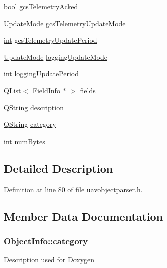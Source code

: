 \begin{DoxyCompactItemize}
\item 
bool \hyperlink{struct_object_info_aa24c62cec1226eb0b3aa40601db8a06e}{gcs\-Telemetry\-Acked}
\item 
\hyperlink{uavobjectparser_8h_af6f79ca652f5cd37cb76957fb76b1630}{Update\-Mode} \hyperlink{struct_object_info_a62c810f99f09ed18bcb16eb2c564197f}{gcs\-Telemetry\-Update\-Mode}
\item 
\hyperlink{ioapi_8h_a787fa3cf048117ba7123753c1e74fcd6}{int} \hyperlink{struct_object_info_a01aada7cce704710f0c296f60bcb4424}{gcs\-Telemetry\-Update\-Period}
\item 
\hyperlink{uavobjectparser_8h_af6f79ca652f5cd37cb76957fb76b1630}{Update\-Mode} \hyperlink{struct_object_info_af7ceece058b71fa50c2419c1965f16ad}{logging\-Update\-Mode}
\item 
\hyperlink{ioapi_8h_a787fa3cf048117ba7123753c1e74fcd6}{int} \hyperlink{struct_object_info_ab3ab131200aca06627069c30e93553ca}{logging\-Update\-Period}
\item 
\hyperlink{class_q_list}{Q\-List}$<$ \hyperlink{struct_field_info}{Field\-Info} $\ast$ $>$ \hyperlink{struct_object_info_a1deed82421d295df3f13868d69407cde}{fields}
\item 
\hyperlink{group___u_a_v_objects_plugin_gab9d252f49c333c94a72f97ce3105a32d}{Q\-String} \hyperlink{struct_object_info_a4127c29ce714495caadda910f8fc0abe}{description}
\item 
\hyperlink{group___u_a_v_objects_plugin_gab9d252f49c333c94a72f97ce3105a32d}{Q\-String} \hyperlink{struct_object_info_a05329ce770527e65cfe0983c54f414f0}{category}
\item 
\hyperlink{ioapi_8h_a787fa3cf048117ba7123753c1e74fcd6}{int} \hyperlink{struct_object_info_addb6314d2fbbf790c27313fce9f13b98}{num\-Bytes}
\end{DoxyCompactItemize}


\subsection{Detailed Description}


Definition at line 80 of file uavobjectparser.\-h.



\subsection{Member Data Documentation}
\hypertarget{struct_object_info_a05329ce770527e65cfe0983c54f414f0}{
\subsubsection[{category}]{ Object\-Info\-::category}}\label{struct_object_info_a05329ce770527e65cfe0983c54f414f0}
Description used for Doxygen 

